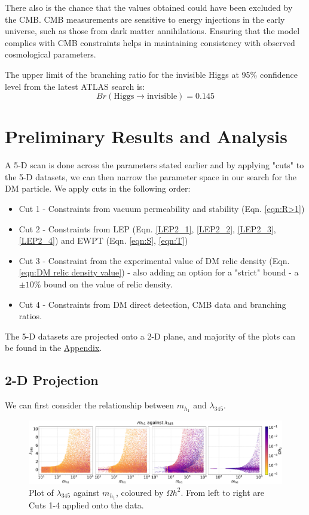 \documentclass[12pt]{article}
\begin{document}
There also is the chance that the values obtained could have been excluded by the CMB. CMB measurements are sensitive to energy injections in the early universe, such as those from dark matter annihilations. Ensuring that the model complies with CMB constraints helps in maintaining consistency with observed cosmological parameters. 

The upper limit of the branching ratio for the invisible Higgs at 95\% confidence level from the latest ATLAS search is\cite{ATLAS:2022yvh}:
\begin{equation}
    Br(\text{Higgs} \rightarrow \text{invisible}) = 0.145
\end{equation}
\section{Preliminary Results and Analysis}
A 5-D scan is done across the parameters stated earlier and by applying "cuts" to the 5-D datasets, we can then narrow the parameter space in our search for the DM particle.
We apply cuts in the following order:
\begin{itemize}
    \item Cut 1 - Constraints from vacuum permeability and stability (Eqn. \ref{eqn:R>1})
    \item Cut 2 - Constraints from LEP (Eqn. \ref{LEP2_1}, \ref{LEP2_2}, \ref{LEP2_3}, \ref{LEP2_4}) and EWPT (Eqn. \ref{eqn:S}, \ref{eqn:T})
    \item Cut 3 - Constraint from the experimental value of DM relic density (Eqn. \ref{eqn:DM relic density value}) - also adding an option for a "strict" bound - a $\pm 10 \%$ bound on the value of relic density.
    \item Cut 4 - Constraints from DM direct detection, CMB data and branching ratios.
\end{itemize}

The 5-D datasets are projected onto a 2-D plane, and majority of the plots can be found in the \hyperref[sec:Appendix]{Appendix}.

\subsection{2-D Projection}
We can first consider the relationship between $m_{h_1}$ and $\lambda_{345}$. 
\begin{figure}
    \centering
    \includegraphics[width=\linewidth]{4plot/MD1_l345.pdf}
    \caption{Plot of $\lambda_{345}$ against $m_{h_1}$, coloured by $\Omega h^2$. From left to right are Cuts 1-4 applied onto the data. }
    \label{fig:enter-label}
\end{figure}
\end{document}
